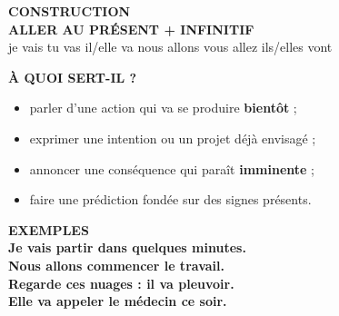 \documentclass[a4paper,11pt]{article}
\begin{document}
\vspace{2.5mm}\hspace*{6mm}
\begin{minipage}{0.91\textwidth}

\begin{orangebox}
\textbf{\color{OrangeDark}CONSTRUCTION}\\[1mm]
\centering
{\Large \textbf{ALLER AU PRÉSENT + INFINITIF}}\\[1mm]
\small
je vais \quad tu vas \quad il/elle va \quad nous allons \quad vous allez \quad ils/elles vont
\end{orangebox}

\vspace{2.5mm}
\begin{center}
\end{center}

\vspace{1.5mm}
\begin{orangebox}
\textbf{\color{OrangeDark}À QUOI SERT-IL ?}\\[1mm]
\begin{itemize}\setlength{\itemsep}{0.4mm}
\item parler d'une action qui va se produire \textbf{bientôt} ;
\item exprimer une intention ou un projet déjà envisagé ;
\item annoncer une conséquence qui paraît \textbf{imminente} ;
\item faire une prédiction fondée sur des signes présents.
\end{itemize}
\end{orangebox}

\vspace{2mm}
\begin{orangebox}
\textbf{\color{OrangeDark}EXEMPLES}\\[1mm]
\textbf{Je vais partir dans quelques minutes.}\\
\textbf{Nous allons commencer le travail.}\\
\textbf{Regarde ces nuages : il va pleuvoir.}\\
\textbf{Elle va appeler le médecin ce soir.}
\end{orangebox}


\end{minipage}
\end{document}
